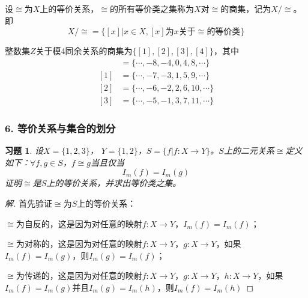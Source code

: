 \documentclass{beamer}
\newtheorem*{Exercise}{习题}
\begin{document}
\begin{CJK*}{UTF8}{gbsn}
\begin{frame}
\end{frame}

\begin{frame}
  \begin{Def}
    设$\cong$为$X$上的等价关系，$\cong$的所有等价类之集称为$X$对$\cong$的商集，记为$X/\cong$。即
    \[X/\cong = \{[x]|x\in X,[x]\text{为}x\text{关于}\cong \text{的等价类}\}\]
  \end{Def}
\pause
  整数集$Z$关于模4同余关系的商集为$\{[1],[2],[3],[4]\}$，其中
  \begin{align*}
    [0]&=\{\cdots,-8,-4,0,4,8,\cdots\}\\
    [1]&=\{\cdots,-7,-3,1,5,9,\cdots\}\\
    [2]&=\{\cdots,-6,-2,2,6,10,\cdots\}\\
    [3]&=\{\cdots,-5,-1,3,7,11,\cdots\}
  \end{align*}
\end{frame}
\begin{frame}
  \frametitle{6. 等价关系与集合的划分}
  \begin{Exercise}
  设$X = \{1,2,3\}$， $Y = \{1,2\}$，$S = \{f|f:X \to Y\}$。$S$上的二元关系$\cong$定义如下：$\forall f,g\in S$，$f \cong g$当且仅当\[I_m(f) = I_m(g)\]证明$\cong$是$S$上的等价关系，并求出等价类之集。    
\end{Exercise}
\pause
\begin{proof}[解]\justifying\let\raggedright\justifying
  首先验证$\cong$为$S$上的等价关系：
  
\pause
    $\cong$为自反的，这是因为对任意的映射$f:X\to Y$，$I_m(f)=I_m(f)$；

    \pause
    $\cong$为对称的，这是因为对任意的映射$f:X\to Y$，$g:X\to Y$，如果$I_m(f)=I_m(g)$，则$I_m(g)=I_m(f)$；

    \pause
    $\cong$为传递的，这是因为对任意的映射$f:X\to Y$，$g:X\to Y$，$h:X\to Y$，如果$I_m(f)=I_m(g)$并且$I_m(g)=I_m(h)$，则$I_m(f)=I_m(h)$
  \end{proof}
  

\end{frame}
\end{CJK*}
\end{document}
